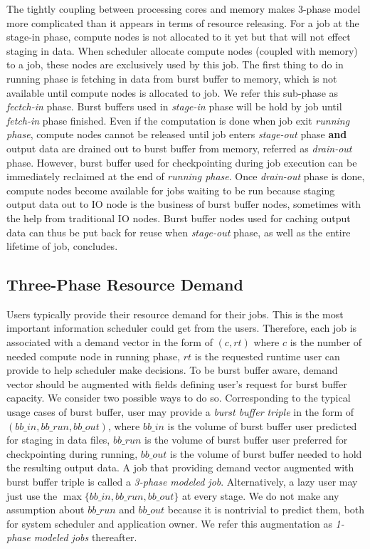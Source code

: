 The tightly coupling between processing cores and memory makes 3-phase model
more complicated than it appears in terms of resource releasing.
For a job at the stage-in phase, compute nodes is not allocated to it yet
but that will not effect staging in data.
When scheduler allocate compute nodes (coupled with memory) to a job,
these nodes are exclusively used by this job.
The first thing to do in running phase is fetching in data from burst buffer to memory,
which is not available until compute nodes is allocated to job.
We refer this sub-phase as \textit{fectch-in} phase.
Burst buffers used in \textit{stage-in} phase will be hold by job
until \textit{fetch-in} phase finished.
Even if the computation is done when job exit \textit{running phase},
compute nodes cannot be released until job enters \textit{stage-out} phase 
\textbf{and} output data are drained out to burst buffer from memory,
referred as \textit{drain-out} phase.
However, burst buffer used for checkpointing during job execution
can be immediately reclaimed at the end of \textit{running phase}.
Once \textit{drain-out} phase is done,
compute nodes become available for jobs waiting to be run
because staging output data out to IO node is the business of burst buffer nodes,
sometimes with the help from traditional IO nodes.
Burst buffer nodes used for caching output data can thus be put back for reuse
when \textit{stage-out} phase, as well as the entire lifetime of job, concludes.


\subsection{Three-Phase Resource Demand}
Users typically provide their resource demand for their jobs.
This is the most important information scheduler could get from the users.
Therefore, each job is associated with a demand vector in the form of $(c, rt)$
where $c$ is the number of needed compute node in running phase,
$rt$ is the requested runtime user can provide to help scheduler make decisions.
To be burst buffer aware, demand vector should be augmented
with fields defining user's request for burst buffer capacity.
We consider two possible ways to do so.
Corresponding to the typical usage cases of burst buffer,
user may provide a \textit{burst buffer triple} in the form of $(bb\_in, bb\_run, bb\_out)$,
where $bb\_in$ is the volume of burst buffer user predicted for staging in data files,
$bb\_run$ is the volume of burst buffer user preferred for checkpointing during running,
$bb\_out$ is the volume of burst buffer needed to hold the resulting output data.
A job that providing demand vector augmented with
burst buffer triple is called a \textit{3-phase modeled job}.
Alternatively, a lazy user may just use the $\max\{bb\_in, bb\_run, bb\_out\}$ at every stage.
We do not make any assumption about $bb\_run$ and $bb\_out$ because it is nontrivial to predict them,
both for system scheduler and application owner.
We refer this augmentation as
\textit{1-phase modeled jobs} thereafter.


